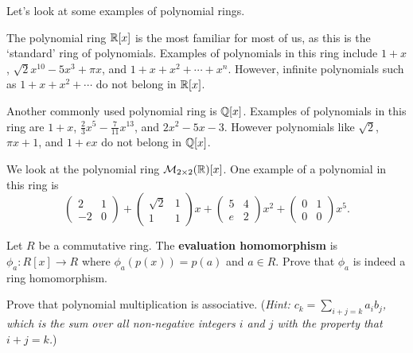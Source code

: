 Let's look at some examples of polynomial rings.
\begin{example}
    The polynomial ring $\mathbb{R}[x]$ is the most familiar for most of us, as this is the `standard' ring of polynomials. Examples of polynomials in this ring include $1+x$, $\sqrt2x^{10} - 5x^3 + \pi x$, and $1+x+x^2+\cdots+x^n$. However, infinite polynomials such as $1+x+x^2+\cdots$ do not belong in $\mathbb{R}[x]$.
\end{example}
\begin{example}
    Another commonly used polynomial ring is $\mathbb{Q}[x]$. Examples of polynomials in this ring are $1+x$, $\frac23x^5 - \frac7{11}x^{13}$, and $2x^2-5x-3$. However polynomials like $\sqrt2$, $\pi x + 1$, and $1+ex$ do not belong in $\mathbb{Q}[x]$.
\end{example}
\begin{example}
    We look at the polynomial ring $\mathcal{M}_{2\times2}(\mathbb{R})[x]$. One example of a polynomial in this ring is
    \[
        \begin{pmatrix}2&1\\-2&0\end{pmatrix} + \begin{pmatrix}\sqrt2&1\\1&1\end{pmatrix}x + \begin{pmatrix}5&4\\e&2\end{pmatrix}x^2 + \begin{pmatrix}0&1\\0&0\end{pmatrix}x^5.
    \]
\end{example}

\begin{exercise}\label{exercise-polynomial-evaluation-is-ring-homomorphism}
    Let $R$ be a commutative ring. The \textbf{evaluation homomorphism} is $\phi_a: R[x] \to R$ where $\phi_a(p(x)) = p(a)$ and $a \in R$. Prove that $\phi_a$ is indeed a ring homomorphism.
\end{exercise}
\begin{exercise}\label{exercise-polynomial-multiplication-is-associative}
    Prove that polynomial multiplication is associative.\newline
    (\textit{Hint: $\displaystyle c_k = \sum_{i+j=k} a_ib_j$, which is the sum over all non-negative integers $i$ and $j$ with the property that $i+j=k$.})
\end{exercise}

